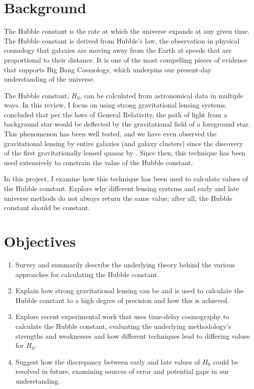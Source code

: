 \documentclass[12pt]{report}
\begin{document}
\section{Background}

The Hubble constant is the rate at which the universe expands at any given time. The Hubble constant is derived from Hubble's law, the observation in physical cosmology that galaxies are moving away from the Earth at speeds that are proportional to their distance. It is one of the most compelling pieces of evidence that supports Big Bang Cosmology, which underpins our present-day understanding of the universe.

The Hubble constant, $H_0$, can be calculated from astronomical data in multiple ways. In this review, I focus on using strong gravitational lensing systems. \textcite{Refsdal1964} concluded that per the laws of General Relativity, the path of light from a background star would be deflected by the gravitational field of a foreground star. This phenomenon has been well tested, and we have even observed the gravitational lensing by entire galaxies (and galaxy clusters) since the discovery of the first gravitationally lensed quasar by \textcite{Walsh1980}. Since then, this technique has been used extensively to constrain the value of the Hubble constant.

In this project, I examine how this technique has been used to calculate values of the Hubble constant. Explore why different lensing systems and early and late universe methods do not always return the same value; after all, the Hubble constant should be constant.

\section{Objectives}

\begin{enumerate}
    \item Survey and summarily describe the underlying theory behind the various approaches for calculating the Hubble constant.
    \item Explain how strong gravitational lensing can be and is used to calculate the Hubble constant to a high degree of precision and how this is achieved. 
    \item Explore recent experimental work that uses time-delay cosmography to calculate the Hubble constant, evaluating the underlying methodology's strengths and weaknesses and how different techniques lead to differing values for $H_{0}$.
    \item Suggest how the discrepancy between early and late values of $H_{0}$ could be resolved in future, examining sources of error and potential gaps in our understanding. 
\end{enumerate}
\end{document}
